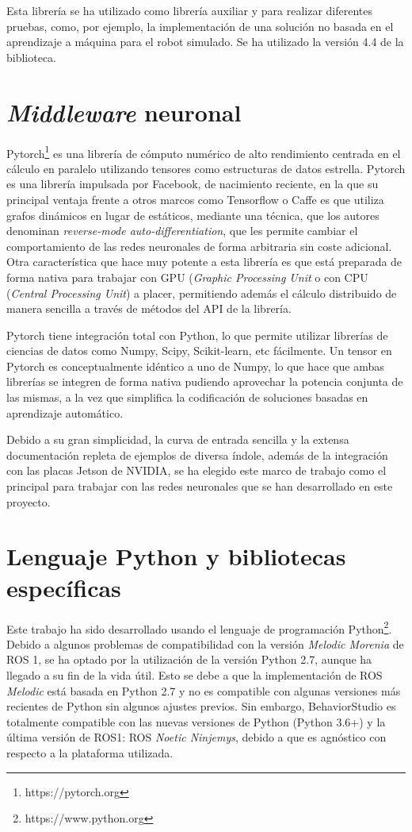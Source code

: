 Esta librería se ha utilizado como librería auxiliar y para realizar diferentes pruebas, como, por ejemplo, la implementación de una solución no basada en el aprendizaje a máquina para el robot simulado. Se ha utilizado la versión 4.4 de la biblioteca.

\section{\textit{Middleware} neuronal}

Pytorch\footnote{https://pytorch.org} es una librería de cómputo numérico de alto rendimiento centrada en el cálculo en paralelo utilizando tensores como estructuras de datos estrella. Pytorch es una librería impulsada por Facebook, de nacimiento reciente, en la que su principal ventaja frente a otros marcos como Tensorflow o Caffe es que utiliza grafos dinámicos en lugar de estáticos, mediante una técnica, que los autores denominan \textit{reverse-mode auto-differentiation}, que les permite cambiar el comportamiento de las redes neuronales de forma arbitraria sin coste adicional. Otra característica que hace muy potente a esta librería es que está preparada de forma nativa para trabajar con GPU (\textit{Graphic Processing Unit} o con CPU (\textit{Central Processing Unit}) a placer, permitiendo además el cálculo distribuido de manera sencilla a través de métodos del API de la librería.

Pytorch tiene integración total con Python, lo que permite utilizar librerías de ciencias de datos como Numpy, Scipy, Scikit-learn, etc fácilmente. Un tensor en Pytorch es conceptualmente idéntico a uno de Numpy, lo que hace que ambas librerías se integren de forma nativa pudiendo aprovechar la potencia conjunta de las mismas, a la vez que simplifica la codificación de soluciones basadas en aprendizaje automático.

Debido a su gran simplicidad, la curva de entrada sencilla y la extensa documentación repleta de ejemplos de diversa índole, además de la integración con las placas Jetson de NVIDIA, se ha elegido este marco de trabajo como el principal para trabajar con las redes neuronales que se han desarrollado en este proyecto.

\section{Lenguaje Python y bibliotecas específicas}

Este trabajo ha sido desarrollado usando el lenguaje de programación Python\footnote{https://www.python.org}. Debido a algunos problemas de compatibilidad con la versión \textit{Melodic Morenia} de ROS 1, se ha optado por la utilización de la versión Python 2.7, aunque ha llegado a su fin de la vida útil. Esto se debe a que la implementación de ROS \textit{Melodic} está basada en Python 2.7 y no es compatible con algunas versiones más recientes de Python sin algunos ajustes previos. Sin embargo, BehaviorStudio es totalmente compatible con las nuevas versiones de Python (Python 3.6+) y la última versión de ROS1: ROS \textit{Noetic Ninjemys}, debido a que es agnóstico con respecto a la plataforma utilizada. 

